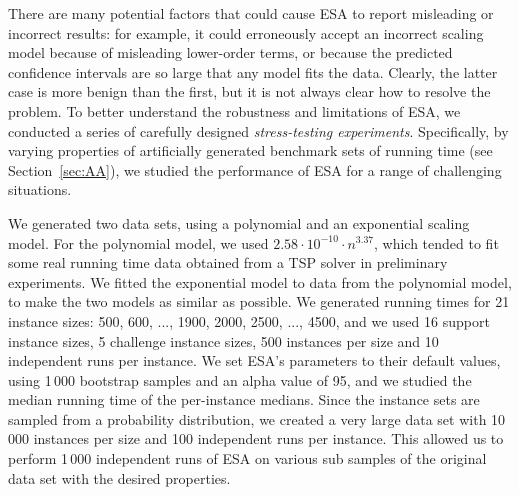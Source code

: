 \documentclass[aic]{iosart2x}
\begin{document}
There are many potential factors that could cause ESA to report misleading or incorrect results: for example, it could erroneously accept an incorrect scaling model because of misleading lower-order terms, or because the predicted confidence intervals are so large that any model fits the data. 
Clearly, the latter case is more benign than the first, but it is not always clear how to resolve the problem. 
To better understand the robustness and limitations of ESA, we conducted a series of carefully designed \emph{stress-testing experiments}.
Specifically, by varying properties of artificially generated benchmark sets of running time (see Section~\ref{sec:AA}), we studied the performance of ESA for a range of challenging situations.


We generated two data sets, using a polynomial and an exponential scaling model. For the polynomial model, we used $2.58\cdot 10^{-10} \cdot n^{3.37}$, which tended to fit some real running time data obtained from a TSP solver in preliminary experiments. 
We fitted the exponential model to data from the polynomial model, to make the two models as similar as possible. 
We generated running times for 21 instance sizes: 500, 600, ..., 1900, 2000, 2500, ..., 4500, and we used 16 support instance sizes, 5 challenge instance sizes, 500 instances per size and 10 independent runs per instance. 
We set ESA's parameters to their default values, using 1\,000 bootstrap samples and an alpha value of 95, and we studied the median running time of the per-instance medians. 
Since the instance sets are sampled from a probability distribution, we created a very large data set with 10\,000 instances per size and 100 independent runs per instance. 
This allowed us to perform 1\,000 independent runs of ESA on various sub samples of the original data set with the desired properties.
\end{document}
